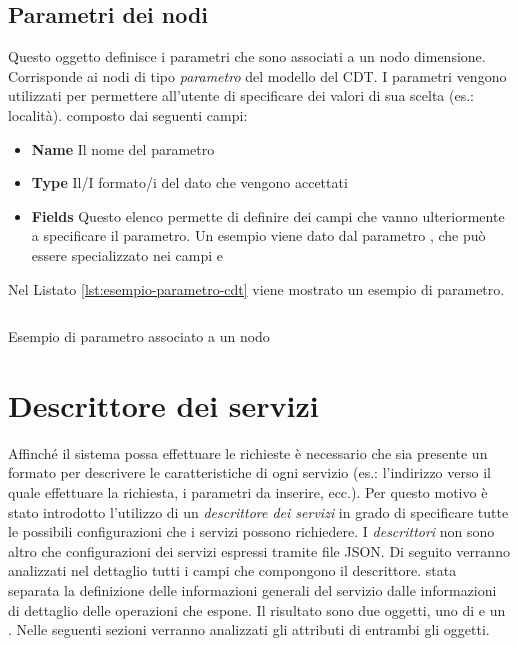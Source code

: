 \subsection{Parametri dei nodi\label{sec:parametro-cdt}}

Questo oggetto definisce i parametri che sono associati a un nodo dimensione. Corrisponde ai nodi di tipo \emph{parametro} del modello del CDT. I parametri vengono utilizzati per permettere all'utente di specificare dei valori di sua scelta (es.: località). \upe composto dai seguenti campi:

\begin{itemize}
	\item \textbf{Name}
	Il nome del parametro
	\item \textbf{Type}
	Il/I formato/i del dato che vengono accettati
	\item \textbf{Fields}
	Questo elenco permette di definire dei campi che vanno ulteriormente a specificare il parametro. Un esempio viene dato dal parametro , che può essere specializzato nei campi  e 
\end{itemize}

Nel Listato \ref{lst:esempio-parametro-cdt} viene mostrato un esempio di parametro.

\clearpage

\begin{listing}[ht]
	\inputminted{json}{5-implementazione-backend/Codice/esempio_parametro_cdt.json}
	\caption{Esempio di parametro associato a un nodo}
	\label{lst:esempio-parametro-cdt}
\end{listing}

\section{Descrittore dei servizi\label{sec:descrittore-servizi}}

Affinché il sistema possa effettuare le richieste è necessario che sia presente un formato per descrivere le caratteristiche di ogni servizio (es.: l'indirizzo verso il quale effettuare la richiesta, i parametri da inserire, ecc.). Per questo motivo è stato introdotto l'utilizzo di un \emph{descrittore dei servizi} in grado di specificare tutte le possibili configurazioni che i servizi possono richiedere. I \emph{descrittori} non sono altro che configurazioni dei servizi espressi tramite file JSON. Di seguito verranno analizzati nel dettaglio tutti i campi che compongono il descrittore. \upe stata separata la definizione delle informazioni generali del servizio dalle informazioni di dettaglio delle operazioni che espone. Il risultato sono due oggetti, uno di  e un . Nelle seguenti sezioni verranno analizzati gli attributi di entrambi gli oggetti.

